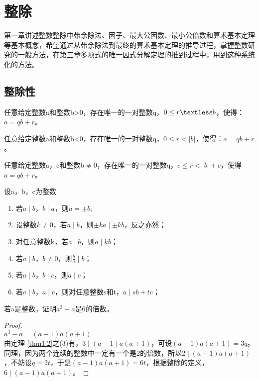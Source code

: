 \documentclass[cn,10pt]{elegantbook}
\begin{document}
\chapter{整除}
第一章讲述整数整除中带余除法、因子、最大公因数、最小公倍数和算术基本定理等基本概念，希望通过从带余除法到最终的算术基本定理的推导过程，掌握整数研究的一般方法，在第三章多项式的唯一因式分解定理的推到过程中，用到这种系统化的方法。
\section{整除性}

\begin{theorem}[带余除法]\label{thm1.1}
  任意给定整数a和整数b>0，存在唯一的一对整数q，$0 \leq r \textless b$，使得：$a = qb + r$。
\end{theorem}

\begin{corollary}
  任意给定整数a和整数b<0，存在唯一的一对整数q，$0\leq r < \left| b \right| $，使得：$a = qb + r$。
\end{corollary}

\begin{corollary}
任意给定整数a，c和整数b$\ne$0，存在唯一的一对整数q，$c\leq r < \left| b \right| + c$，使得$a = qb + r$。
\end{corollary}

\begin{theorem}[整除性质]\label{thm1.2}
设a，b，c为整数
\begin{enumerate}[(1)]
\item 若$a \mid b $，$ b \mid a $，则$ a = \pm b $;
\item 设整数$k \neq 0$，若$a\mid b$，则$\pm ka \mid \pm kb$，反之亦然；
\item 对任意整数k，若$a\mid b $，则$a \mid kb$；
\item 若$a \mid b$，$b \neq 0$，则$\frac{b}{a} \mid b$；
\item 若$a \mid b$，$b \mid c$，则$a \mid c$；
\item 若$a \mid b$，$a \mid c$，则对任意整数s和t，$a \mid sb+ tc$；  
\end{enumerate} 
\end{theorem}

\begin{example}
  若a是整数，证明$a^3-a$是6的倍数。
\end{example}

\begin{proof}
\\$a^3-a=(a-1)a(a+1)$
\\由定理 \ref{thm1.2}之(3)有，$3 \mid (a-1)a(a+1)$，可设$(a-1)a(a+1) = 3q$。
\\同理，因为两个连续的整数中一定有一个是2的倍数，所以$2 \mid (a-1)a(a+1)$，不妨设$q = 2t$，于是$(a-1)a(a+1)= 6t$，根据整除的定义，$6 \mid (a-1)a(a+1)$。
\end{proof}
\end{document}
